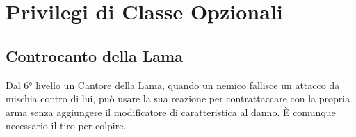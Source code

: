 
\section{Privilegi di Classe Opzionali}

\subsection{Controcanto della Lama}

Dal 6° livello un Cantore della Lama, quando un nemico fallisce un attacco da mischia contro di lui, può usare la sua reazione per contrattaccare con la propria arma senza aggiungere il modificatore di caratteristica al danno. È comunque necessario il tiro per colpire.